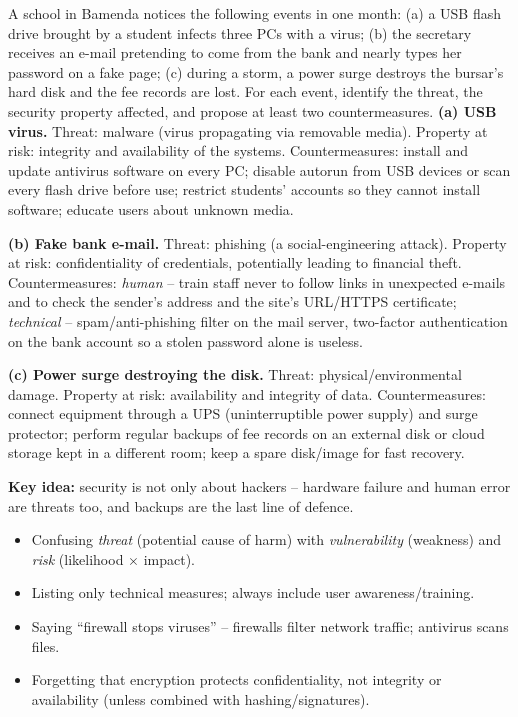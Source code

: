 \documentclass[11pt]{article}
\newcommand{\cle}[1]{{\popxbold\color{popdark}#1}}
\begin{document}
\begin{exoresolu}
A school in Bamenda notices the following events in one month: (a) a USB flash drive brought by a student infects three PCs with a virus; (b) the secretary receives an e-mail pretending to come from the bank and nearly types her password on a fake page; (c) during a storm, a power surge destroys the bursar's hard disk and the fee records are lost. For each event, identify the threat, the security property affected, and propose at least two countermeasures.
\tcblower
\textbf{(a) USB virus.} Threat: \cle{malware} (virus propagating via removable media). Property at risk: integrity and availability of the systems. Countermeasures: install and update \cle{antivirus} software on every PC; disable autorun from USB devices or scan every flash drive before use; restrict students' accounts so they cannot install software; educate users about unknown media.

\textbf{(b) Fake bank e-mail.} Threat: \cle{phishing} (a social-engineering attack). Property at risk: confidentiality of credentials, potentially leading to financial theft. Countermeasures: \emph{human} -- train staff never to follow links in unexpected e-mails and to check the sender's address and the site's URL/HTTPS certificate; \emph{technical} -- spam/anti-phishing filter on the mail server, two-factor authentication on the bank account so a stolen password alone is useless.

\textbf{(c) Power surge destroying the disk.} Threat: \cle{physical/environmental} damage. Property at risk: availability and integrity of data. Countermeasures: connect equipment through a \cle{UPS} (uninterruptible power supply) and surge protector; perform regular \cle{backups} of fee records on an external disk or cloud storage kept in a different room; keep a spare disk/image for fast recovery.

\textbf{Key idea:} security is not only about hackers -- hardware failure and human error are threats too, and backups are the last line of defence.
\end{exoresolu}

\begin{attention}
\begin{itemize}
\item Confusing \emph{threat} (potential cause of harm) with \emph{vulnerability} (weakness) and \emph{risk} (likelihood $\times$ impact).
\item Listing only technical measures; always include user awareness/training.
\item Saying ``firewall stops viruses'' -- firewalls filter network traffic; antivirus scans files.
\item Forgetting that encryption protects confidentiality, not integrity or availability (unless combined with hashing/signatures).
\end{itemize}
\end{attention}
\end{document}
